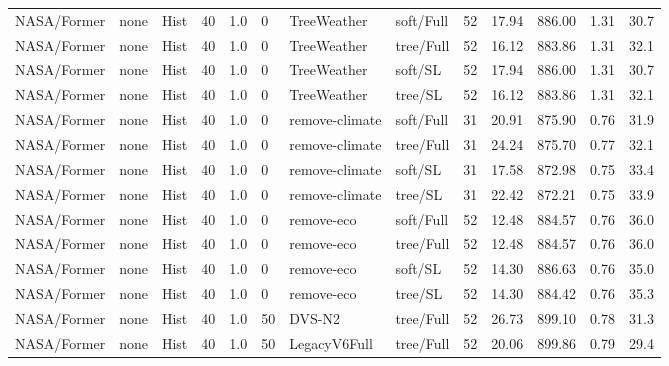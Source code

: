 \documentclass[10pt,a4paper]{article}
\begin{document}
\begin{landscape}
\begin{longtable}{llllllllrrrrr}
NASA/Former & none & Hist & 40 & 1.0 & 0 & TreeWeather & soft/Full & 52 & 17.94 & 886.00 & 1.31 & 30.7 \\

NASA/Former & none & Hist & 40 & 1.0 & 0 & TreeWeather & tree/Full & 52 & 16.12 & 883.86 & 1.31 & 32.1 \\

NASA/Former & none & Hist & 40 & 1.0 & 0 & TreeWeather & soft/SL & 52 & 17.94 & 886.00 & 1.31 & 30.7 \\

NASA/Former & none & Hist & 40 & 1.0 & 0 & TreeWeather & tree/SL & 52 & 16.12 & 883.86 & 1.31 & 32.1 \\

NASA/Former & none & Hist & 40 & 1.0 & 0 & remove-climate & soft/Full & 31 & 20.91 & 875.90 & 0.76 & 31.9 \\

NASA/Former & none & Hist & 40 & 1.0 & 0 & remove-climate & tree/Full & 31 & 24.24 & 875.70 & 0.77 & 32.1 \\

NASA/Former & none & Hist & 40 & 1.0 & 0 & remove-climate & soft/SL & 31 & 17.58 & 872.98 & 0.75 & 33.4 \\

NASA/Former & none & Hist & 40 & 1.0 & 0 & remove-climate & tree/SL & 31 & 22.42 & 872.21 & 0.75 & 33.9 \\

NASA/Former & none & Hist & 40 & 1.0 & 0 & remove-eco & soft/Full & 52 & 12.48 & 884.57 & 0.76 & 36.0 \\

NASA/Former & none & Hist & 40 & 1.0 & 0 & remove-eco & tree/Full & 52 & 12.48 & 884.57 & 0.76 & 36.0 \\

NASA/Former & none & Hist & 40 & 1.0 & 0 & remove-eco & soft/SL & 52 & 14.30 & 886.63 & 0.76 & 35.0 \\

NASA/Former & none & Hist & 40 & 1.0 & 0 & remove-eco & tree/SL & 52 & 14.30 & 884.42 & 0.76 & 35.3 \\

NASA/Former & none & Hist & 40 & 1.0 & 50 & DVS-N2 & tree/Full & 52 & 26.73 & 899.10 & 0.78 & 31.3 \\

NASA/Former & none & Hist & 40 & 1.0 & 50 & LegacyV6Full & tree/Full & 52 & 20.06 & 899.86 & 0.79 & 29.4 \\


\end{longtable}
\end{landscape}
\end{document}
